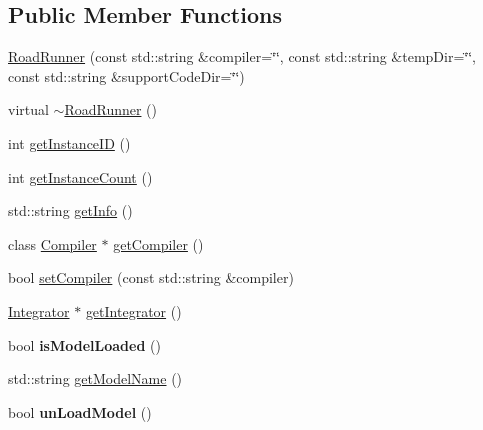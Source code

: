 \subsection*{Public Member Functions}
\begin{DoxyCompactItemize}
\item 
\hyperlink{classrr_1_1_road_runner_a626f4bfe3accf4c6b0b61695b63ec481}{Road\-Runner} (const std\-::string \&compiler=\char`\"{}\char`\"{}, const std\-::string \&temp\-Dir=\char`\"{}\char`\"{}, const std\-::string \&support\-Code\-Dir=\char`\"{}\char`\"{})
\item 
virtual \hyperlink{classrr_1_1_road_runner_a102e7c27e29219ae56e48ffd607fd621}{$\sim$\-Road\-Runner} ()
\item 
int \hyperlink{classrr_1_1_road_runner_a6cc53f3668f94b3d88764e14b24bc87e}{get\-Instance\-I\-D} ()
\item 
int \hyperlink{classrr_1_1_road_runner_a4860f41d8552118f3c8c5d5fb6d999f6}{get\-Instance\-Count} ()
\item 
std\-::string \hyperlink{classrr_1_1_road_runner_a2b7022cadd857fa4fb3cb24703da608a}{get\-Info} ()
\item 
class \hyperlink{classrr_1_1_compiler}{Compiler} $\ast$ \hyperlink{classrr_1_1_road_runner_a329f2009c2688bbedc906c21c4b8b3ef}{get\-Compiler} ()
\item 
bool \hyperlink{classrr_1_1_road_runner_a4ce7d696fb39f5db0d9e4fa9f8f1192c}{set\-Compiler} (const std\-::string \&compiler)
\item 
\hyperlink{classrr_1_1_integrator}{Integrator} $\ast$ \hyperlink{classrr_1_1_road_runner_ac7ed0222daee67405616805b1bd02125}{get\-Integrator} ()
\item 
\hypertarget{classrr_1_1_road_runner_aecea2dbffc17d0322b00e18f126058b5}{bool {\bfseries is\-Model\-Loaded} ()}\label{classrr_1_1_road_runner_aecea2dbffc17d0322b00e18f126058b5}

\item 
std\-::string \hyperlink{classrr_1_1_road_runner_a9519f489ada956e35bd0b65e44e96cdd}{get\-Model\-Name} ()
\item 
\hypertarget{classrr_1_1_road_runner_ad19a3a222b25a0751ae8e968eec5eb45}{bool {\bfseries un\-Load\-Model} ()}\label{classrr_1_1_road_runner_ad19a3a222b25a0751ae8e968eec5eb45}


\end{DoxyCompactItemize}
